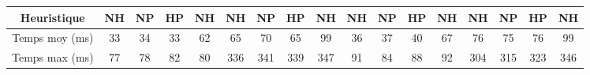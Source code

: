\documentclass[8pt]{article}
\begin{document}
\begin{table}[h]
\begin{tabular}{|c|cccccccc|cccccccc|}
		Heuristique         & \multicolumn{1}{c|}{\cellcolor[HTML]{F7DFDF}NH}   & \multicolumn{1}{c|}{\cellcolor[HTML]{F7DFDF}NP}    & \multicolumn{1}{c|}{\cellcolor[HTML]{F7DFDF}HP}   & \multicolumn{1}{c|}{\cellcolor[HTML]{F7DFDF}NH}    & \multicolumn{1}{c|}{\cellcolor[HTML]{FFEBEB}NH}  & \multicolumn{1}{c|}{\cellcolor[HTML]{FFEBEB}NP}  & \multicolumn{1}{c|}{\cellcolor[HTML]{FFEBEB}HP}  & \cellcolor[HTML]{FFEBEB}NH  & \multicolumn{1}{c|}{\cellcolor[HTML]{BBE0E9}NH} & \multicolumn{1}{c|}{\cellcolor[HTML]{BBE0E9}NP} & \multicolumn{1}{c|}{\cellcolor[HTML]{BBE0E9}HP} & \multicolumn{1}{c|}{\cellcolor[HTML]{BBE0E9}NH} & \multicolumn{1}{c|}{\cellcolor[HTML]{D6F7FF}NH}  & \multicolumn{1}{c|}{\cellcolor[HTML]{D6F7FF}NP}  & \multicolumn{1}{c|}{\cellcolor[HTML]{D6F7FF}HP}  & \cellcolor[HTML]{D6F7FF}NH  \\ \hline
		Temps moy (ms)      & \multicolumn{1}{c|}{\cellcolor[HTML]{F7DFDF}33}   & \multicolumn{1}{c|}{\cellcolor[HTML]{F7DFDF}34}    & \multicolumn{1}{c|}{\cellcolor[HTML]{F7DFDF}33}   & \multicolumn{1}{c|}{\cellcolor[HTML]{F7DFDF}62}    & \multicolumn{1}{c|}{\cellcolor[HTML]{FFEBEB}65}  & \multicolumn{1}{c|}{\cellcolor[HTML]{FFEBEB}70}  & \multicolumn{1}{c|}{\cellcolor[HTML]{FFEBEB}65}  & \cellcolor[HTML]{FFEBEB}99  & \multicolumn{1}{c|}{\cellcolor[HTML]{BBE0E9}36} & \multicolumn{1}{c|}{\cellcolor[HTML]{BBE0E9}37} & \multicolumn{1}{c|}{\cellcolor[HTML]{BBE0E9}40} & \multicolumn{1}{c|}{\cellcolor[HTML]{BBE0E9}67} & \multicolumn{1}{c|}{\cellcolor[HTML]{D6F7FF}76}  & \multicolumn{1}{c|}{\cellcolor[HTML]{D6F7FF}75}  & \multicolumn{1}{c|}{\cellcolor[HTML]{D6F7FF}76}  & \cellcolor[HTML]{D6F7FF}99  \\ \hline
		Temps max (ms)      & \multicolumn{1}{c|}{\cellcolor[HTML]{F7DFDF}77}   & \multicolumn{1}{c|}{\cellcolor[HTML]{F7DFDF}78}    & \multicolumn{1}{c|}{\cellcolor[HTML]{F7DFDF}82}   & \multicolumn{1}{c|}{\cellcolor[HTML]{F7DFDF}80}    & \multicolumn{1}{c|}{\cellcolor[HTML]{FFEBEB}336} & \multicolumn{1}{c|}{\cellcolor[HTML]{FFEBEB}341} & \multicolumn{1}{c|}{\cellcolor[HTML]{FFEBEB}339} & \cellcolor[HTML]{FFEBEB}347 & \multicolumn{1}{c|}{\cellcolor[HTML]{BBE0E9}91} & \multicolumn{1}{c|}{\cellcolor[HTML]{BBE0E9}84} & \multicolumn{1}{c|}{\cellcolor[HTML]{BBE0E9}88} & \multicolumn{1}{c|}{\cellcolor[HTML]{BBE0E9}92} & \multicolumn{1}{c|}{\cellcolor[HTML]{D6F7FF}304} & \multicolumn{1}{c|}{\cellcolor[HTML]{D6F7FF}315} & \multicolumn{1}{c|}{\cellcolor[HTML]{D6F7FF}323} & \cellcolor[HTML]{D6F7FF}346 \\ \hline

\end{tabular}
\end{table}
\end{document}
